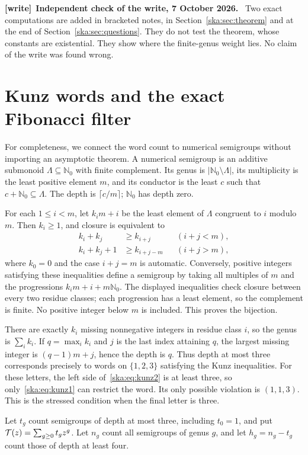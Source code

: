 \documentclass[11pt,letterpaper]{article}
\theoremstyle{definition}
\newcommand{\N}{\mathbb N}\newcommand{\Z}{\mathbb Z}
\newenvironment{writenote}[1][]{\par\smallskip\begingroup\small
 \noindent\textbf{[write]}\if\relax\detokenize{#1}\relax\else~\textbf{#1.}\fi\ }%
 {\par\endgroup\smallskip}
\begin{document}
\begin{writenote}[Independent check of the write, 7 October 2026]
Two exact computations are added in bracketed notes, in Section~\ref{ska:sec:theorem} and at the end of
Section~\ref{ska:sec:questions}. They do not test the theorem, whose constants are existential. They show where
the finite-genus weight lies. No claim of the write was found wrong.
\end{writenote}

\section{Kunz words and the exact Fibonacci filter}\label{ska:sec:kunz}
For completeness, we connect the word count to numerical semigroups without importing an asymptotic theorem. A numerical semigroup is an additive submonoid $\Lambda\subseteq\N_0$ with finite complement. Its genus is $|\N_0\setminus\Lambda|$, its multiplicity is the least positive element $m$, and its conductor is the least $c$ such that $c+\N_0\subseteq\Lambda$. The depth is $\lceil c/m\rceil$; $\N_0$ has depth zero.

For each $1\le i<m$, let $k_i m+i$ be the least element of $\Lambda$ congruent to $i$ modulo $m$. Then $k_i\ge1$, and closure is equivalent to
\begin{align}
k_i+k_j&\ge k_{i+j} &&(i+j<m),\label{ska:eq:kunz1}\\
k_i+k_j+1&\ge k_{i+j-m} &&(i+j>m),\label{ska:eq:kunz2}
\end{align}
where $k_0=0$ and the case $i+j=m$ is automatic. Conversely, positive integers satisfying these inequalities define a semigroup by taking all multiples of $m$ and the progressions $k_i m+i+m\N_0$. The displayed inequalities check closure between every two residue classes; each progression has a least element, so the complement is finite. No positive integer below $m$ is included. This proves the bijection.

There are exactly $k_i$ missing nonnegative integers in residue class $i$, so the genus is $\sum_i k_i$. If $q=\max_i k_i$ and $j$ is the last index attaining $q$, the largest missing integer is $(q-1)m+j$, hence the depth is $q$. Thus depth at most three corresponds precisely to words on $\{1,2,3\}$ satisfying the Kunz inequalities. For these letters, the left side of~\eqref{ska:eq:kunz2} is at least three, so only~\eqref{ska:eq:kunz1} can restrict the word. Its only possible violation is $(1,1,3)$. This is the stressed condition when the final letter is three.

Let $t_g$ count semigroups of depth at most three, including $t_0=1$, and put $\mathcal T(z)=\sum_{g\ge0}t_gz^g$. Let $n_g$ count all semigroups of genus $g$, and let $h_g=n_g-t_g$ count those of depth at least four.
\end{document}
